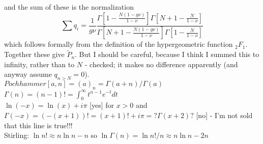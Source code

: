 and the sum of these is the normalization
\begin{equation*}
\sum q_i = \frac{1}{g\nu} \frac{\Gamma[1-\frac{N(1-g\nu)}{1-\nu}]\Gamma[N+1-\frac{N}{1-\nu}]}{\Gamma[N+1-\frac{N(1-g\nu)}{1-\nu}]\Gamma[1-\frac{N}{1-\nu}]}
\end{equation*}
which follows formally from the definition of the hypergeometric function $_2F_1$. Together these give $\widetilde{P}_n$. 
\iffalse
But I should be careful, because I think I summed this to infinity, rather than to $N$ - checked; it makes no difference apparently (and anyway assume $q_{n>N}=0$). \\
$Pochhammer[a,n] = (a)_n = \Gamma(a+n)/\Gamma(a)$ \\
$\Gamma(n) = (n-1)! = \int_0^\infty t^{n-1}e^{-t}dt$ \\
$\ln(-x)=\ln(x)+i\pi$ [yes] for $x>0$ and $\Gamma(-x)=(-(x+1))!=(x+1)!+i\pi=?\Gamma(x+2)?$ [no] - I'm not sold that this line is true!!! \\
Stirling: $\ln n! \approx n \ln n - n$ so $\ln \Gamma(n) = \ln n!/n \approx n\ln n - 2n$ \\
